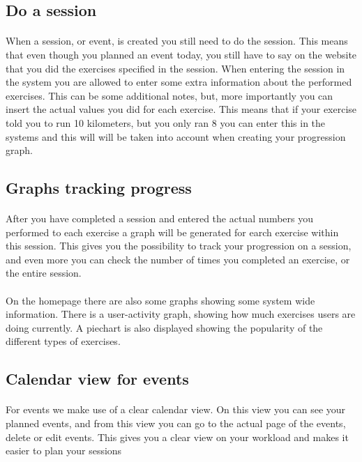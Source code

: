\documentclass[11pt,a4paper]{scrartcl}
\begin{document}
\subsection{Do a session}
\paragraph{}When a session, or event, is created you still need to do the session. This means that even though you planned an event today, you still have to say on the website that you did the exercises specified in the session. When entering the session in the system you are allowed to enter some extra information about the performed exercises. This can be some additional notes, but, more importantly you can insert the actual values you did for each exercise. This means that if your exercise told you to run 10 kilometers, but you only ran 8 you can enter this in the systems and this will will be taken into account when creating your progression graph.
\subsection{Graphs tracking progress}
\paragraph{}After you have completed a session and entered the actual numbers you performed to each exercise a graph will be generated for earch exercise within this session. This gives you the possibility to track your progression on a session, and even more you can check the number of times you completed an exercise, or the entire session.
\paragraph{}On the homepage there are also some graphs showing some system wide information. There is a user-activity graph, showing how much exercises users are doing currently. A piechart is also displayed showing the popularity of the different types of exercises.
\subsection{Calendar view for events}
\paragraph{}For events we make use of a clear calendar view. On this view you can see your planned events, and from this view you can go to the actual page of the events, delete or edit events. This gives you a clear view on your workload and makes it easier to plan your sessions
\end{document}
